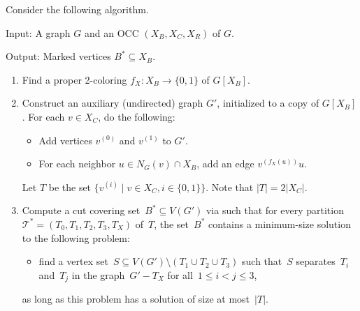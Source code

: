 \begin{marking} \label{algo:mark:B:star} 
	Consider the following algorithm.

	Input: A graph $G$ and an OCC $(X_B, X_C, X_R)$ of $G$. 

	Output: Marked vertices $B^\ast \subseteq X_B$.
%
	\begin{enumerate}
		\item \label{itm:mark:coloring} Find a proper 2-coloring $f_X \colon X_B \to \{0,1\}$ of $G[X_B]$.
		\item \label{itm:mark:auxiliary} Construct an auxiliary (undirected) graph $G'$, initialized to a copy of $G[X_B]$. For each $v \in X_C$, do the following:
		\begin{itemize}
				\item Add vertices $v^{(0)}$ and $v^{(1)}$ to $G'$.
				\item For each neighbor $u \in N_G(v) \cap X_B$, add an edge $v^{(f_X(u))}u$.
		\end{itemize}
		Let $T$ be the set $\{v^{(i)} \mid v \in X_C, i \in \{0,1\}\}$.
		Note that $|T|=2|X_C|$.
		\item \label{itm:mark:cut:covering} Compute a cut covering set~$B^\ast \subseteq V(G')$ via  such that for every partition~$\mathcal{T}^* = (T_0, T_1, T_2, T_3, T_X)$ of~$T$, the set~$B^*$ contains a minimum-size solution to the following problem: 
		\begin{itemize}
			\item find a vertex set~$S \subseteq V(G') \setminus (T_1 \cup T_2 \cup T_3)$ such that~$S$ separates~$T_i$ and~$T_j$ in the graph~$G' - T_X$ for all~$1 \leq i < j \leq 3$, 
		\end{itemize}
		as long as this problem has a solution of size at most~$|T|$.
	\end{enumerate}
\end{marking}
